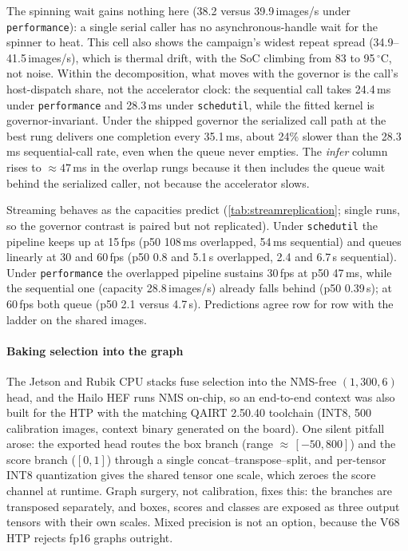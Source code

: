 The spinning wait gains nothing here (38.2 versus 39.9\,images/s under
\texttt{performance}): a single serial caller has no
asynchronous-handle wait for the spinner to heat. This cell also shows
the campaign's widest repeat spread (34.9--41.5\,images/s), which is
thermal drift, with the SoC climbing from 83 to 95\,$^\circ$C, not
noise. Within the decomposition, what moves with the governor is the
call's host-dispatch share, not the accelerator clock: the sequential
call takes 24.4\,ms under \texttt{performance} and 28.3\,ms under
\texttt{schedutil}, while the fitted kernel is governor-invariant.
Under the shipped governor the serialized call path at the best rung delivers one completion every 35.1\,ms, about 24\%
slower than the 28.3\,ms sequential-call rate, even when the queue
never empties. The \emph{infer} column rises to ${\approx}47$\,ms in
the overlap rungs because it then includes the queue wait behind the
serialized caller, not because the accelerator slows.

Streaming behaves as the capacities predict
(\cref{tab:streamreplication}; single runs, so the governor contrast
is paired but not replicated). Under \texttt{schedutil} the pipeline
keeps up at 15\,fps (p50 108\,ms overlapped, 54\,ms sequential) and
queues linearly at 30 and 60\,fps (p50 0.8 and 5.1\,s overlapped, 2.4
and 6.7\,s sequential). Under \texttt{performance} the overlapped
pipeline sustains 30\,fps at p50 47\,ms, while the sequential one
(capacity 28.8\,images/s) already falls behind (p50 0.39\,s); at
60\,fps both queue (p50 2.1 versus 4.7\,s). Predictions agree row for
row with the ladder on the shared images.

\paragraph{Baking selection into the graph}
The Jetson and Rubik CPU stacks fuse selection into the NMS-free
$(1{,}300{,}6)$ head, and the Hailo HEF runs NMS on-chip, so an
end-to-end context was also built for the HTP with the matching QAIRT
2.50.40 toolchain (INT8, 500 calibration images, context binary
generated on the board). One silent pitfall arose: the exported head
routes the box branch (range ${\approx}\,[-50,800]$) and the score
branch ($[0,1]$) through a single concat--transpose--split, and
per-tensor INT8 quantization gives the shared tensor one scale, which
zeroes the score channel at runtime. Graph surgery, not calibration,
fixes this: the branches are transposed separately, and boxes, scores
and classes are exposed as three output tensors with their own
scales. Mixed precision is not an option, because the V68 HTP rejects
fp16 graphs outright.

